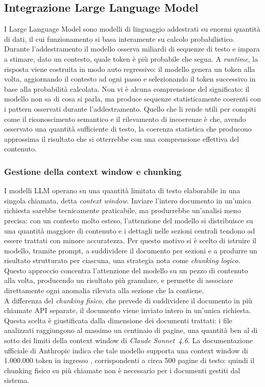 \subsection{Integrazione Large Language Model}
I Large Language Model sono modelli di linguaggio addestrati su enormi quantità di dati, il cui funzionamento si basa interamente su calcolo probabilistico. Durante l'addestramento il modello osserva miliardi di sequenze di testo e impara a stimare, dato un contesto, quale token è più probabile che segua. A \emph{runtime}, la risposta viene costruita in modo auto regressivo: il modello genera un token alla volta, aggiornando il contesto ad ogni passo e selezionando il token successivo in base alla probabilità calcolata. Non vi è alcuna comprensione del significato: il modello non sa di cosa si parla, ma produce sequenze statisticamente coerenti con i pattern osservati durante l'addestramento. Quello che li rende utili per compiti come il riconoscimento semantico e il rilevamento di incoerenze è che, avendo osservato una quantità sufficiente di testo, la coerenza statistica che producono approssima il risultato che si otterrebbe con una comprensione effettiva del contenuto.

\subsubsection{Gestione della context window e chunking}
\label{subsubsection:chunking}
I modelli LLM operano su una quantità limitata di testo elaborabile in una singola chiamata, detta \emph{context window}. Inviare l'intero documento in un'unica richiesta sarebbe tecnicamente praticabile, ma produrrebbe un'analisi meno precisa: con un contesto molto esteso, l'attenzione del modello si distribuisce su una quantità maggiore di contenuto e i dettagli nelle sezioni centrali tendono ad essere trattati con minore accuratezza. Per questo motivo si è scelto di istruire il modello, tramite prompt, a suddividere il documento per sezioni e a produrre un risultato strutturato per ciascuna, una strategia nota come \emph{chunking logico}. Questo approccio concentra l'attenzione del modello su un pezzo di contenuto alla volta, producendo un risultato più granulare, e permette di associare direttamente ogni anomalia rilevata alla sezione che la contiene.\\

A differenza del \emph{chunking fisico}, che prevede di suddividere il documento in più chiamate API separate, il documento viene inviato intero in un'unica richiesta. Questa scelta è giustificata dalla dimensione dei documenti trattati: i file analizzati raggiungono al massimo un centinaio di pagine, una quantità ben al di sotto dei limiti della context window di \emph{Claude Sonnet~4.6}. La documentazione ufficiale di Anthropic indica che tale modello supporta una context window di 1.000.000 token in ingresso \cite{site:anthropic_models_overview}, corrispondenti a circa 500 pagine di testo: quindi il chunking fisico su più chiamate non è necessario per i documenti gestiti dal sistema.

